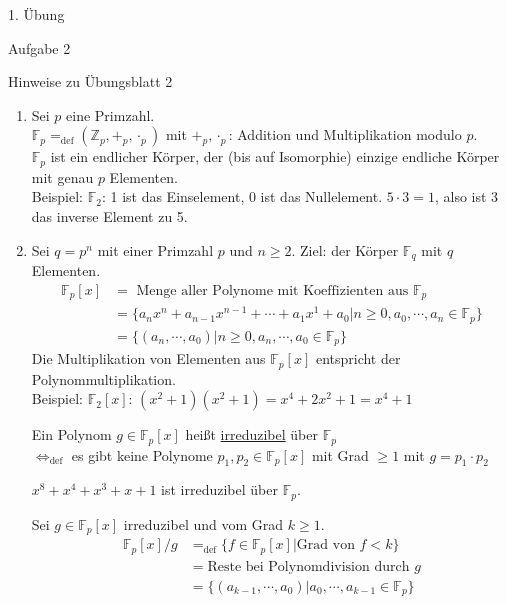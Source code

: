 \begin{section}{1. Übung}
\begin{subsection}{Aufgabe 2}
  \end{subsection}
  
  \begin{subsection}{Hinweise zu Übungsblatt 2}
   \begin{enumerate}
    \item Sei $p$ eine Primzahl.\\
    $\mathbb{F}_p =_{\text{def}} (\mathbb{Z}_p, +_p, \cdot_p)$ mit $+_p, \cdot_p$: Addition und Multiplikation modulo $p$. \\
    $\mathbb{F}_p$ ist ein endlicher Körper, der (bis auf Isomorphie) einzige endliche Körper mit genau $p$ Elementen. \\
    Beispiel: $\mathbb{F}_2$: 1 ist das Einselement, 0 ist das Nullelement. $5\cdot3=1$, also ist 3 das inverse Element zu 5.
    \item Sei $q = p^n$ mit einer Primzahl $p$ und $ n \geq 2$. Ziel: der Körper $\mathbb{F}_q$ mit $q$ Elementen. \\
    \begin{align*}
    \mathbb{F}_p[x] & = \text{ Menge aller Polynome mit Koeffizienten aus }\mathbb{F}_p \\
    & = \{a_nx^n + a_{n-1}x^{n-1}+\cdots+a_1x^1+a_0 | n \geq 0, a_0,\cdots,a_n \in \mathbb{F}_p\} \\
    & = \{(a_n,\cdots,a_0)|n \geq 0, a_n,\cdots,a_0 \in \mathbb{F}_p\}
    \end{align*}
    Die Multiplikation von Elementen aus $\mathbb{F}_p[x]$ entspricht der Polynommultiplikation. \\
    Beispiel: $\mathbb{F}_2[x]$: $(x^2+1)(x^2+1) = x^4 + 2x^2+1 = x^4+1$

    \begin{definition}
      Ein Polynom $g \in \mathbb{F}_p[x]$ heißt \underline{irreduzibel} über $\mathbb{F}_p$ \\
      $\Leftrightarrow_\text{def}$ es gibt keine Polynome $p_1, p_2 \in \mathbb{F}_p[x]$ mit Grad $ \geq 1$ mit $g=p_1\cdot p_2$
    \end{definition}
    \begin{satz}
      $x^8+x^4+x^3+x+1$ ist irreduzibel über $\mathbb{F}_p$.
    \end{satz}
    
    \begin{definition}
      Sei $g \in \mathbb{F}_p[x]$ irreduzibel und vom Grad $k \geq 1$. \\
      \begin{align*}
       \mathbb{F}_p[x] / g & =_\text{def} \{f \in \mathbb{F}_p[x] | \text{Grad von } f < k\} \\
       & = \text{Reste bei Polynomdivision durch }g \\
       & = \{(a_{k-1}, \cdots, a_0) | a_0, \cdots, a_{k-1} \in \mathbb{F}_p\}
      \end{align*}
    \end{definition}


\end{enumerate}
\end{subsection}
\end{section}
